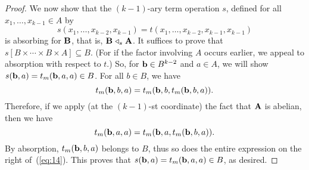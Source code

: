 \begin{proof}
  We now show that the $(k-1)$-ary term operation $s$, defined for all 
  $x_1, \dots, x_{k-1} \in A$ by 
  \[
  s(x_1, \dots, x_{k-2}, x_{k-1})=
  t(x_1, \dots, x_{k-2}, x_{k-1}, x_{k-1})
  \]
  is absorbing for $\mathbf{B}$, that is, $\mathbf{B} \mathrel{\triangleleft}_{s} \mathbf{A}$.  It suffices to
  prove that $s[B \times \cdots \times B \times A] \subseteq B$. 
  (For if the factor involving $A$ occurs earlier, we appeal to
  absorption with respect to $t$.)
  So, for $\mathbf{b} \in B^{k-2}$ and $a\in A$, we will show 
  $s(\mathbf{b}, a) = t_m(\mathbf{b}, a,a) \in B$.  For all $b\in B$, we have
  \[
  t_m(\mathbf{b}, b, a) = t_m(\mathbf{b}, b, t_m(\mathbf{b}, b, a)).
  \]
  Therefore, if we apply (at the $(k-1)$-st coordinate) 
  the fact that $\mathbf{A}$ is abelian, then we have
  \begin{equation}
    \label{eq:14}
    t_m(\mathbf{b}, a, a) = t_m(\mathbf{b}, a, t_m(\mathbf{b}, b, a)).
  \end{equation}
  By absorption, $t_m(\mathbf{b}, b, a)$ belongs to $B$, thus so does the
  entire expression on the right of~(\ref{eq:14}).  This proves that 
  $s(\mathbf{b}, a) = t_m(\mathbf{b}, a,a) \in B$, as desired.
\end{proof}

\bigskip

